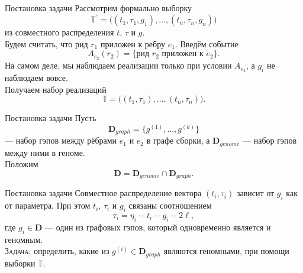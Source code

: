 \documentclass[unicode, notheorems]{beamer}
\begin{document}
\begin{frame}{Постановка задачи}
	Рассмотрим формально выборку \[ \mathbb{T}^\prime = \Big( (t_1, \tau_1, g_1), \ldots, (t_n, \tau_n, g_n) \Big) \] из совместного распределения $t$, $\tau$ и $g$.\\
	\vspace{0.2cm}
	Будем считать, что рид $r_1$ приложен к ребру $e_1$.  Введём событие \[ A_{e_2}(r_2) = \{\text{рид } r_2 \text{ приложен к } e_2\}. \]
	\vspace{0.2cm}
	На самом деле, мы наблюдаем реализации только при условии $A_{e_2}$, а $g_i$ не наблюдаем вовсе.\\
	\vspace{0.2cm}
	Получаем набор реализаций
	\[ \mathbb{T} = \Big( (t_1, \tau_1), \ldots, (t_n, \tau_n) \Big). \]
\end{frame}
\begin{frame}{Постановка задачи}
	Пусть \[\mathbf{D}_{graph} = \{g^{(1)}, \ldots, g^{(k)}\}\] --- набор гэпов между рёбрами $e_1$ и $e_2$ в графе сборки, а
	$\mathbf{D}_{genome}$ --- набор гэпов между ними в геноме.\\
	\vspace{0.2cm}
	Положим \[ \mathbf{D} = \mathbf{D}_{genome} \cap \mathbf{D}_{graph}. \]
\end{frame}
\begin{frame}{Постановка задачи}
	Совместное распределение вектора $(t_i, \tau_i)$ зависит от $g_i$ как от параметра. При этом $t_i$, $\tau_i$ и $g_i$ связаны соотношением
	\begin{equation*}
		\tau_i = \eta_i - t_i - g_i - 2\ell,
	\end{equation*}
	где $g_i  \in \mathbf{D}$ --- один из графовых гэпов,  который одновременно является и геномным.\\
	\vspace{0.5cm}
	\textsc{Задача}: определить, какие из $g^{(i)} \in \mathbf{D}_{graph}$ являются геномными, при помощи выборки $\mathbb{T}$.
\end{frame}

\end{document}
